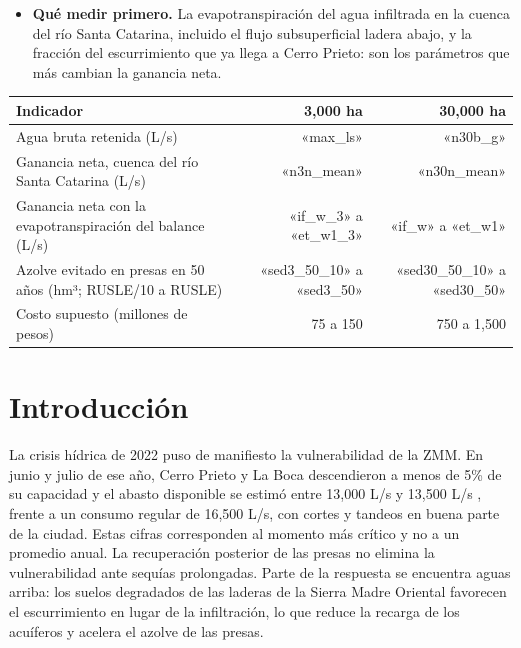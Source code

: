 \begin{itemize}
  \item \textbf{Qué medir primero.} La evapotranspiración del agua infiltrada en la cuenca del río Santa Catarina, incluido el flujo subsuperficial ladera abajo, y la fracción del escurrimiento que ya llega a Cerro Prieto: son los parámetros que más cambian la ganancia neta.
\end{itemize}

\begin{center}\small
\begin{tabular}{lrr}
\toprule
Indicador & 3,000 ha & 30,000 ha \\
\midrule
Agua bruta retenida (L/s) & «max_ls» & «n30b_g» \\
Ganancia neta, cuenca del río Santa Catarina (L/s) & «n3n_mean» & «n30n_mean» \\
Ganancia neta con la evapotranspiración del balance (L/s) & «if_w_3» a «et_w1_3» & «if_w» a «et_w1» \\
Azolve evitado en presas en 50 años (hm³; RUSLE/10 a RUSLE) & «sed3_50_10» a «sed3_50» & «sed30_50_10» a «sed30_50» \\
Costo supuesto (millones de pesos) & 75 a 150 & 750 a 1,500 \\
\bottomrule
\end{tabular}
\end{center}
\newpage
{\hypersetup{linkcolor=black}\tableofcontents}
\thispagestyle{frente}
\newpage
{}
\pagestyle{cuerpo}


\section{Introducción}

La crisis hídrica de 2022 puso de manifiesto la vulnerabilidad de la ZMM. En junio y julio de ese año, Cerro Prieto y La Boca descendieron a menos de 5\% de su capacidad y el abasto disponible se estimó entre 13,000 L/s  y 13,500 L/s , frente a un consumo regular de 16,500 L/s, con cortes y tandeos en buena parte de la ciudad. Estas cifras corresponden al momento más crítico y no a un promedio anual. La recuperación posterior de las presas no elimina la vulnerabilidad ante sequías prolongadas. Parte de la respuesta se encuentra aguas arriba: los suelos degradados de las laderas de la Sierra Madre Oriental favorecen el escurrimiento en lugar de la infiltración, lo que reduce la recarga de los acuíferos y acelera el azolve de las presas.

